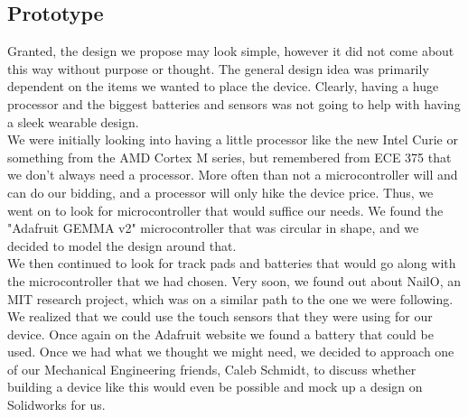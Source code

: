 \documentclass[12pt,letterpaper]{article}
\begin{document}
\subsection*{Prototype}
\hspace{1cm}Granted, the design we propose may look simple, however it did not come about this way without purpose or thought. The general design idea was primarily dependent on the items we wanted to place the device. Clearly, having a huge processor and the biggest batteries and sensors was not going to help with having a sleek wearable design.\\
\hspace{1cm}We were initially looking into having a little processor like the new Intel Curie or something from the AMD Cortex M series, but remembered from ECE 375 that we don't always need a processor. More often than not a microcontroller will and can do our bidding, and a processor will only hike the device price. Thus, we went on to look for microcontroller that would suffice our needs. We found the "Adafruit GEMMA v2" microcontroller that was circular in shape, and we decided to model the design around that.\\
\hspace{1cm}We then continued to look for track pads and batteries that would go along with the microcontroller that we had chosen. Very soon, we found out about NailO, an MIT research project, which was on a similar path to the one we were following. We realized that we could use the touch sensors that they were using for our device. Once again on the Adafruit website we found a battery that could be used. Once we had what we thought we might need, we decided to approach one of our Mechanical Engineering friends, Caleb Schmidt, to discuss whether building a device like this would even be possible and mock up a design on Solidworks for us.\\
\end{document}
